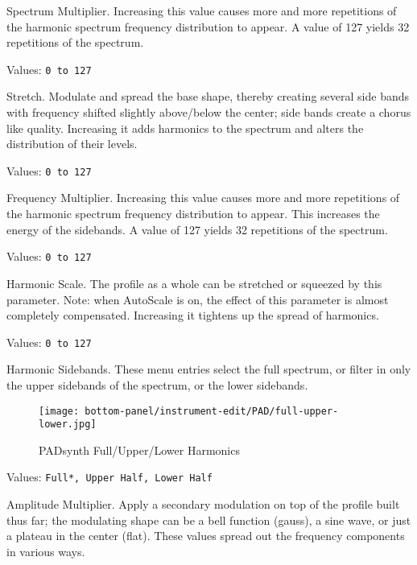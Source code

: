    Spectrum Multiplier.
   Increasing this value causes more and more repetitions of the harmonic
   spectrum frequency distribution to appear.  A value of 127 yields 32
   repetitions of the spectrum.

   Values: \texttt{0 to 127}

   Stretch.
   Modulate and spread the base shape, thereby creating several side bands with
   frequency shifted slightly above/below the center; side bands create a
   chorus like quality.
   Increasing it adds harmonics to the
   spectrum and alters the distribution of their levels.

   Values: \texttt{0 to 127}

   Frequency Multiplier.
   Increasing this value causes more and more repetitions of the harmonic
   spectrum frequency distribution to appear.
   This increases the energy of the sidebands.
   A value of 127 yields 32 repetitions of the spectrum.

   Values: \texttt{0 to 127}

   Harmonic Scale.
   The profile as a whole can be stretched or squeezed by this parameter.  Note:
   when AutoScale is on, the effect of this parameter is almost
   completely compensated.
   Increasing it tightens up the spread of harmonics.

   Values: \texttt{0 to 127}

   Harmonic Sidebands.
   These menu entries select the full spectrum, or filter in only
   the upper sidebands of the spectrum, or the lower sidebands.

\begin{figure}[H]
   \centering
   \texttt{[image: bottom-panel/instrument-edit/PAD/full-upper-lower.jpg]}
   \caption{PADsynth Full/Upper/Lower Harmonics}
   \label{fig:padsynth_full_upper_lower}
\end{figure}

   Values: \texttt{Full*, Upper Half, Lower Half}

   Amplitude Multiplier.
   Apply a secondary modulation on top of the profile built thus far; the
   modulating shape can be a bell function (gauss), a sine wave, or just a plateau
   in the center (flat).   These values spread out the frequency components in
   various ways.

